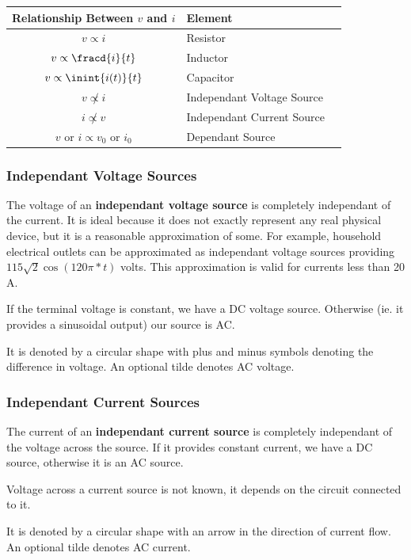 \documentclass[12pt]{article}
\begin{document}
\begin{table}[ht]
\centering
  \begin{tabular}{clc}
  Relationship Between $v$ and $i$ & Element \\ \hline 
  $v \propto i$ & Resistor \\
  $v \propto \fracd{i}{t}$ & Inductor \\
  $v \propto \inint{i(t)}{t}$ & Capacitor \\
  $v \not\propto i$ & Independant Voltage Source \\
  $i \not\propto v$ & Independant Current Source \\
  $v$ or $i \propto v_0$ or $i_0$ & Dependant Source \\ \hline
  \end{tabular}
\end{table}

\subsubsection*{Independant Voltage Sources}
The voltage of an {\bf independant voltage source} is completely independant of the current. It is ideal because it does not exactly represent any real physical device, but it is a reasonable approximation of some. For example, household electrical outlets can be approximated as independant voltage sources providing $115\sqrt{2}\cos(120\pi *t)$ volts. This approximation is valid for currents less than 20 A.

If the terminal voltage is constant, we have a DC voltage source. Otherwise (ie. it provides a sinusoidal output) our source is AC.

It is denoted by a circular shape with plus and minus symbols denoting the difference in voltage. An optional tilde denotes AC voltage.

\subsubsection*{Independant Current Sources}
The current of an {\bf independant current source} is completely independant of the voltage across the source. If it provides constant current, we have a DC source, otherwise it is an AC source.

Voltage across a current source is not known, it depends on the circuit connected to it.

It is denoted by a circular shape with an arrow in the direction of current flow. An optional tilde denotes AC current.
\end{document}
